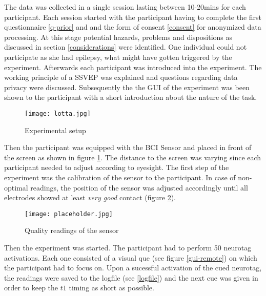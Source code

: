             The data was collected in a single session lasting between 10-20mins for each participant. Each session started with the participant having to complete the first questionnaire \ref*{q-prior} and and the form of consent \ref*{consent} for anonymized data processing. At this stage potential hazards, problems and dispositions as discussed in section \ref{considerations} were identified. One individual could not participate as she had epilepsy, what might have gotten triggered by the experiment.
            Afterwards each participant was introduced into the experiment. The working principle of a SSVEP was explained and questions regarding data privacy were discussed. Subsequently the the GUI of the experiment was been shown to the participant with a short introduction about the nature of the task.

            \begin{figure}[h]     %
                \centering
                \texttt{[image: lotta.jpg]} 
                \caption{Experimental setup}\label{experimental-setup}
            \end{figure}            

            Then the participant was equipped with the BCI Sensor and placed in front of the screen as shown in figure \ref*{experimental-setup}. The distance to the screen was varying since each participant needed to adjust according to eyesight. The first step of the experiment was the calibration of the sensor to the participant. In case of non-optimal readings, the position of the sensor was adjusted accordingly until all electrodes showed at least \textit{very good} contact (figure \ref*{electrode-quality}).

            \begin{figure}[h]     %
                \centering
                \texttt{[image: placeholder.jpg]} 
                \caption{Quality readings of the sensor}\label{electrode-quality}
            \end{figure}

            Then the experiment was started. The participant had to perform 50 neurotag activations. Each one consisted of a visual que (see figure \ref*{gui-remote}) on which the participant had to focus on. Upon a sucessful activation of the cued neurotag, the readings were saved to the logfile (see \ref*{logfile}) and the next cue was given in order to keep the $t1$ timing as short as possible.

